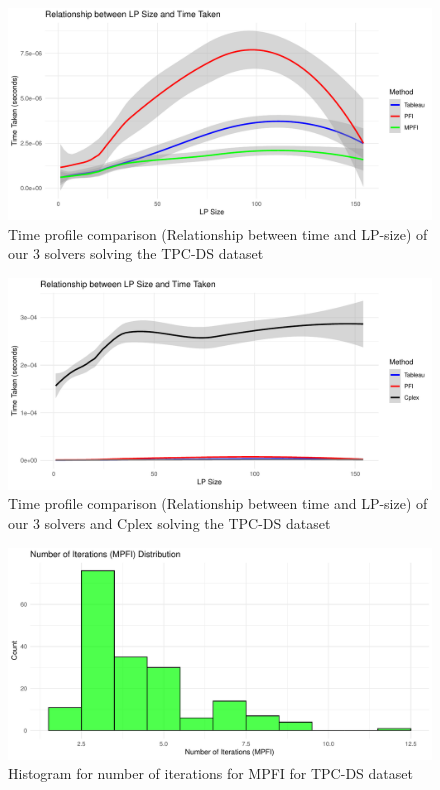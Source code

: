 \begin{figure}[!htb]
    \centering
    \includegraphics[width=\linewidth]{figures/methods_time_tpcds.pdf}
    \caption{Time profile comparison (Relationship between time and LP-size) of our 3 solvers solving the TPC-DS dataset}
    \label{fig:methods_time_tpcds}
\end{figure}

\begin{figure}[!htb]
    \centering
    \includegraphics[width=\linewidth]{figures/cplex_vs_all_tpcds.pdf}
    \caption{Time profile comparison (Relationship between time and LP-size) of our 3 solvers and Cplex solving the TPC-DS dataset}
    \label{fig:cplex_time_tpcds}
\end{figure}

\begin{figure}[!htb]
    \centering
    \includegraphics[width=\linewidth]{figures/num_iter_tpcds_mpfi.pdf}
    \caption{Histogram for number of iterations for MPFI for TPC-DS dataset}
    \label{fig:num_iter_tpcds_mpfi}
\end{figure}

